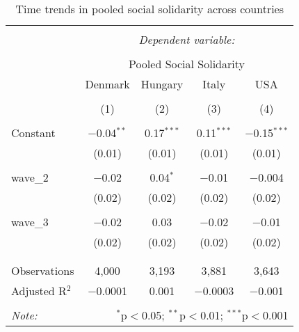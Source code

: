 
\begin{table}[!htbp] \centering 
  \caption{Time trends in pooled social solidarity across countries} 
  \label{tab:reg_sol_2} 
\begin{tabular}{@{\extracolsep{5pt}}lcccc} 
\\[-1.8ex]\hline 
\hline \\[-1.8ex] 
 & \multicolumn{4}{c}{\textit{Dependent variable:}} \\ 
\cline{2-5} 
\\[-1.8ex] & \multicolumn{4}{c}{Pooled Social Solidarity} \\ 
 & Denmark & Hungary & Italy & USA \\ 
\\[-1.8ex] & (1) & (2) & (3) & (4)\\ 
\hline \\[-1.8ex] 
 Constant & $-$0.04$^{**}$ & 0.17$^{***}$ & 0.11$^{***}$ & $-$0.15$^{***}$ \\ 
  & (0.01) & (0.01) & (0.01) & (0.01) \\ 
  & & & & \\ 
 wave\_2 & $-$0.02 & 0.04$^{*}$ & $-$0.01 & $-$0.004 \\ 
  & (0.02) & (0.02) & (0.02) & (0.02) \\ 
  & & & & \\ 
 wave\_3 & $-$0.02 & 0.03 & $-$0.02 & $-$0.01 \\ 
  & (0.02) & (0.02) & (0.02) & (0.02) \\ 
  & & & & \\ 
\hline \\[-1.8ex] 
Observations & 4,000 & 3,193 & 3,881 & 3,643 \\ 
Adjusted R$^{2}$ & $-$0.0001 & 0.001 & $-$0.0003 & $-$0.001 \\ 
\hline 
\hline \\[-1.8ex] 
\textit{Note:}  & \multicolumn{4}{r}{$^{*}$p$<$0.05; $^{**}$p$<$0.01; $^{***}$p$<$0.001} \\ 
\end{tabular} 
\end{table} 

